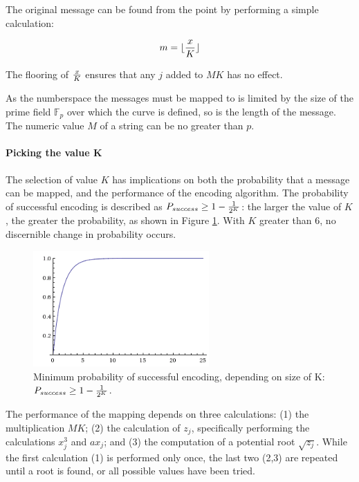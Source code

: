 The original message can be found from the point by performing a simple calculation:

\begin{equation}
	m = {\lfloor {x \over K} \rfloor}
\end{equation}

The flooring of \(x \over K\) ensures that any \(j\) added to \(MK\) has no effect.\cite{MappingAMessage}

As the numberspace the messages must be mapped to is limited by the size of the prime field \(\mathbb{F}_p\) over which the curve is defined, so is the
length of the message. The numeric value \(M\) of a string can be no greater than \(p\).

\paragraph{Picking the value K}

The selection of value \(K\) has implications on both the probability that a message can be mapped, and the performance of the encoding algorithm.
The probability of successful encoding is described as \(P_{success} \geq 1 - {1 \over {2^K}}\): the larger the value of \(K\), the greater the probability,
as shown in Figure \ref{fig:probability}. With \(K\) greater than 6, no discernible change in probability occurs.\cite{MappingAMessage}

\begin{figure}[htb]
	\centering
	\includegraphics[width=0.6\textwidth]{maths/encoding-probability}
	\caption{Minimum probability of successful encoding, depending on size of K: \(P_{success} \geq 1 - {1 \over {2^K}}\).}
	\label{fig:probability}
\end{figure}

The performance of the mapping depends on three calculations: (1) the multiplication \(MK\); (2) the calculation of \(z_j\), specifically
performing the calculations \(x_j^3\) and \(ax_j\); and (3) the computation of a potential root \(\sqrt{z_j}\). While the first calculation (1)
is performed only once, the last two (2,3) are repeated until a root is found, or all possible values have been tried.

